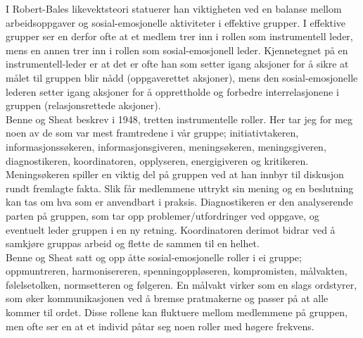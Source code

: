 I Robert-Bales likevektsteori statuerer han viktigheten ved en balanse mellom arbeidsoppgaver og sosial-emosjonelle aktiviteter i effektive grupper. I effektive grupper ser en derfor ofte at et medlem trer inn i rollen som instrumentell leder, mens en annen trer inn i rollen som sosial-emosjonell leder. Kjennetegnet på en instrumentell-leder er at det er ofte han som setter igang aksjoner for å sikre at målet til gruppen blir nådd (oppgaverettet aksjoner), mens den sosial-emosjonelle lederen setter igang aksjoner for å opprettholde og forbedre interrelasjonene i gruppen (relasjonsrettede aksjoner).\\


Benne og Sheat beskrev i 1948, tretten instrumentelle roller. Her tar jeg for meg noen av de som var mest framtredene i vår gruppe; initiativtakeren, informasjonssøkeren, informasjonsgiveren, meningsøkeren, meningsgiveren, diagnostikeren, koordinatoren, opplyseren, energigiveren og kritikeren.
Meningsøkeren spiller en viktig del på gruppen ved at han innbyr til diskusjon rundt fremlagte fakta. Slik får medlemmene uttrykt sin mening og en beslutning kan tas om hva som er anvendbart i praksis. Diagnostikeren er den analyserende parten på gruppen, som tar opp problemer/utfordringer ved oppgave, og eventuelt leder gruppen i en ny retning. Koordinatoren derimot bidrar ved å samkjøre gruppas arbeid og flette de sammen til en helhet.\\

Benne og Sheat satt og opp åtte sosial-emosjonelle roller i ei gruppe; oppmuntreren, harmonisereren, spenningoppløseren, kompromisten, målvakten, følelsetolken, normsetteren og følgeren. En målvakt virker som en slags ordstyrer, som øker kommunikasjonen ved å bremse pratmakerne og passer på at alle kommer til ordet. Disse rollene kan fluktuere mellom medlemmene på gruppen, men ofte ser en at et individ påtar seg noen roller med høgere frekvens.\\
